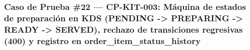 \documentclass[10pt,a4paper]{article}
\begin{document}
\endgroup\medskip


\subsubsection{Caso de Prueba \#22 --- CP-KIT-003: Máquina de estados de preparación en KDS (PENDING -\textgreater{} PREPARING -\textgreater{} READY -\textgreater{} SERVED), rechazo de transiciones regresivas (400) y registro en order\_item\_status\_history}\label{caso-de-prueba-22--cp-kit-003-muxe1quina-de-estados-de-preparaciuxf3n-en-kds-pending---preparing---ready---served-rechazo-de-transiciones-regresivas-400-y-registro-en-order_item_status_history}

\begingroup\singlespacing\footnotesize\setlength{\parskip}{0pt}
\end{document}
